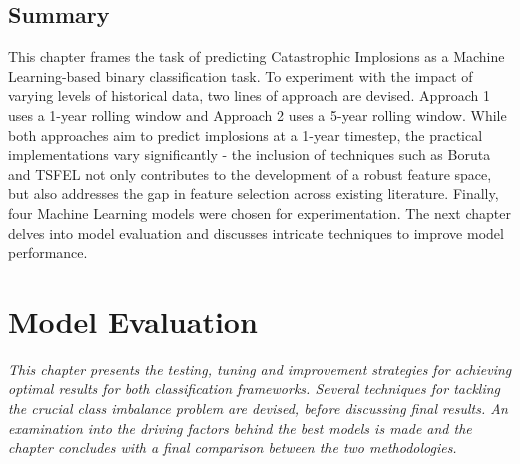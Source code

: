 \documentclass[a4paper]{report}
\begin{document}


\section{Summary}
This chapter frames the task of predicting Catastrophic Implosions as a Machine Learning-based binary classification task. To experiment with 
the impact of varying levels of historical data, two lines of approach are devised. Approach 1 uses a 1-year rolling window and Approach 2 
uses a 5-year rolling window. While both approaches aim to predict implosions at a 1-year timestep, the practical implementations vary significantly - the inclusion 
of techniques such as Boruta and TSFEL not only contributes to the development of a robust feature space, but also addresses the gap in feature selection 
across existing literature. Finally, four Machine Learning models were chosen for experimentation. The next chapter delves into model evaluation and discusses
intricate techniques to improve model performance. 


\chapter{Model Evaluation}
\textit{This chapter presents the testing, tuning and improvement strategies for achieving optimal results for both classification frameworks. Several techniques for tackling 
the crucial class imbalance problem are devised, before discussing final results. An examination into the driving factors behind the 
best models is made and the chapter concludes with a final comparison between the two methodologies.}
\end{document}
